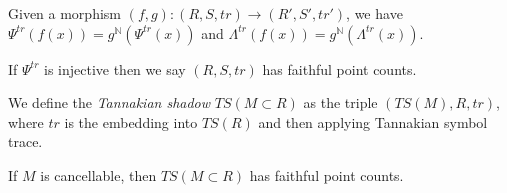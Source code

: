 \begin{proposition}
  Given a morphism $(f, g) : (R, S, tr) \to (R', S', tr')$, we have $\Psi^{tr}(f(x)) = g^{\mathbb{N}}(\Psi^{tr}(x))$ and $\Lambda^{tr}(f(x)) = g^{\mathbb{N}}(\Lambda^{tr}(x))$.
\end{proposition}

\begin{definition}
  If $\Psi^{tr}$ is injective then we say $(R, S, tr)$ has faithful point counts. 
\end{definition}

\begin{definition}
  We define the \emph{Tannakian shadow} $TS(M \subset R)$ as the triple $(TS(M), R, tr)$, where $tr$ is the embedding into $TS(R)$ and then applying Tannakian symbol trace. 
\end{definition}

\begin{proposition}
  If $M$ is cancellable, then $TS(M \subset R)$ has faithful point counts. 
\end{proposition}
